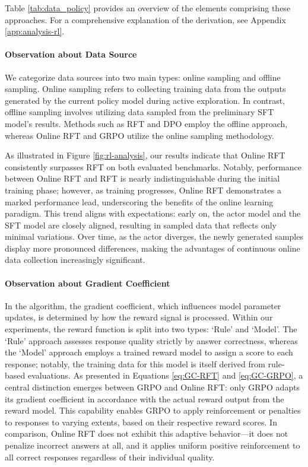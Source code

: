 \begin{itemize}[topsep=0pt]
\begin{itemize}[topsep=0pt]
Table \ref{tab:data_policy} provides an overview of the elements comprising these approaches. For a comprehensive explanation of the derivation, see Appendix \ref{app:analysis-rl}.

\paragraph{Observation about Data Source} We categorize data sources into two main types: online sampling and offline sampling. Online sampling refers to collecting training data from the outputs generated by the current policy model during active exploration. In contrast, offline sampling involves utilizing data sampled from the preliminary SFT model's results. Methods such as RFT and DPO employ the offline approach, whereas Online RFT and GRPO utilize the online sampling methodology.

As illustrated in Figure \ref{fig:rl-analysis}, our results indicate that Online RFT consistently surpasses RFT on both evaluated benchmarks. Notably, performance between Online RFT and RFT is nearly indistinguishable during the initial training phase; however, as training progresses, Online RFT demonstrates a marked performance lead, underscoring the benefits of the online learning paradigm. This trend aligns with expectations: early on, the actor model and the SFT model are closely aligned, resulting in sampled data that reflects only minimal variations. Over time, as the actor diverges, the newly generated samples display more pronounced differences, making the advantages of continuous online data collection increasingly significant.

\paragraph{Observation about Gradient Coefficient} In the algorithm, the gradient coefficient, which influences model parameter updates, is determined by how the reward signal is processed. Within our experiments, the reward function is split into two types: `Rule' and `Model'. The `Rule' approach assesses response quality strictly by answer correctness, whereas the `Model' approach employs a trained reward model to assign a score to each response; notably, the training data for this model is itself derived from rule-based evaluations. As presented in Equations \ref{eq:GC-RFT} and \ref{eq:GC-GRPO}, a central distinction emerges between GRPO and Online RFT: only GRPO adapts its gradient coefficient in accordance with the actual reward output from the reward model. This capability enables GRPO to apply reinforcement or penalties to responses to varying extents, based on their respective reward scores. In comparison, Online RFT does not exhibit this adaptive behavior—it does not penalize incorrect answers at all, and it applies uniform positive reinforcement to all correct responses regardless of their individual quality.


\end{itemize}
\end{itemize}
